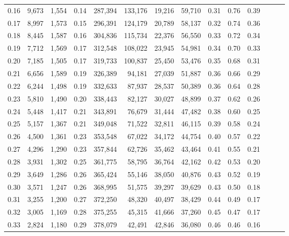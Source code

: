 \begin{tabular}{rrrrrrrrrrrrrr}
0.16 &   9,673 &  1,554 &  0.14 &  287,394 &  133,176 &  19,216 &  59,710 &  0.31 &  0.76 &      0.39 \\
0.17 &   8,997 &  1,573 &  0.15 &  296,391 &  124,179 &  20,789 &  58,137 &  0.32 &  0.74 &      0.36 \\
0.18 &   8,445 &  1,587 &  0.16 &  304,836 &  115,734 &  22,376 &  56,550 &  0.33 &  0.72 &      0.34 \\
0.19 &   7,712 &  1,569 &  0.17 &  312,548 &  108,022 &  23,945 &  54,981 &  0.34 &  0.70 &      0.33 \\
0.20 &   7,185 &  1,505 &  0.17 &  319,733 &  100,837 &  25,450 &  53,476 &  0.35 &  0.68 &      0.31 \\
0.21 &   6,656 &  1,589 &  0.19 &  326,389 &   94,181 &  27,039 &  51,887 &  0.36 &  0.66 &      0.29 \\
0.22 &   6,244 &  1,498 &  0.19 &  332,633 &   87,937 &  28,537 &  50,389 &  0.36 &  0.64 &      0.28 \\
0.23 &   5,810 &  1,490 &  0.20 &  338,443 &   82,127 &  30,027 &  48,899 &  0.37 &  0.62 &      0.26 \\
0.24 &   5,448 &  1,417 &  0.21 &  343,891 &   76,679 &  31,444 &  47,482 &  0.38 &  0.60 &      0.25 \\
0.25 &   5,157 &  1,367 &  0.21 &  349,048 &   71,522 &  32,811 &  46,115 &  0.39 &  0.58 &      0.24 \\
0.26 &   4,500 &  1,361 &  0.23 &  353,548 &   67,022 &  34,172 &  44,754 &  0.40 &  0.57 &      0.22 \\
0.27 &   4,296 &  1,290 &  0.23 &  357,844 &   62,726 &  35,462 &  43,464 &  0.41 &  0.55 &      0.21 \\
0.28 &   3,931 &  1,302 &  0.25 &  361,775 &   58,795 &  36,764 &  42,162 &  0.42 &  0.53 &      0.20 \\
0.29 &   3,649 &  1,286 &  0.26 &  365,424 &   55,146 &  38,050 &  40,876 &  0.43 &  0.52 &      0.19 \\
0.30 &   3,571 &  1,247 &  0.26 &  368,995 &   51,575 &  39,297 &  39,629 &  0.43 &  0.50 &      0.18 \\
0.31 &   3,255 &  1,200 &  0.27 &  372,250 &   48,320 &  40,497 &  38,429 &  0.44 &  0.49 &      0.17 \\
0.32 &   3,005 &  1,169 &  0.28 &  375,255 &   45,315 &  41,666 &  37,260 &  0.45 &  0.47 &      0.17 \\
0.33 &   2,824 &  1,180 &  0.29 &  378,079 &   42,491 &  42,846 &  36,080 &  0.46 &  0.46 &      0.16 \\

\end{tabular}
